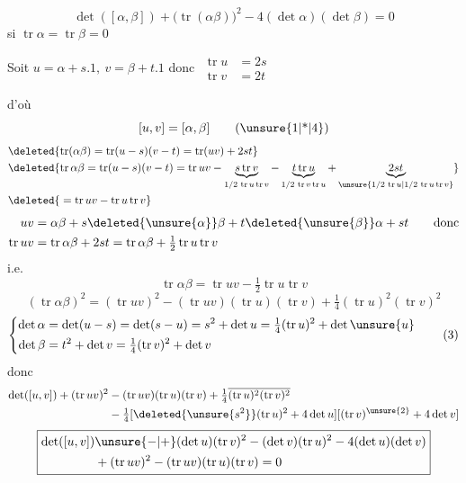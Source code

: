 \[
\det([\alpha,\beta])+\bigl(\operatorname{tr}(\alpha\beta)\bigr)^2-4(\det\alpha)(\det\beta)=0\tag*{(0)}
\]
si $\operatorname{tr}\alpha=\operatorname{tr}\beta=0$

Soit $u=\alpha+s.1,\ v=\beta+t.1$ donc $\begin{aligned}\operatorname{tr}u&=2s\\\operatorname{tr}v&=2t\end{aligned}$

d'où
\[
[u,v]=[\alpha,\beta]\tag*{(\unsure{1|*|4})}
\]
\[
\begin{aligned}
&\deleted{\operatorname{tr}(\alpha\beta)=\operatorname{tr}(u-s)(v-t)=\operatorname{tr}(uv)+2st}\\
&\deleted{\operatorname{tr}\alpha\beta=\operatorname{tr}(u-s)(v-t)=\operatorname{tr}uv-\underbrace{s\operatorname{tr}v}_{1/2\,\operatorname{tr}u\operatorname{tr}v}-\underbrace{t\operatorname{tr}u}_{1/2\,\operatorname{tr}v\operatorname{tr}u}+\underbrace{2st}_{\unsure{1/2\,\operatorname{tr}u|1/2\,\operatorname{tr}u\operatorname{tr}v}}}\\
&\deleted{{}=\operatorname{tr}uv-\operatorname{tr}u\operatorname{tr}v}
\end{aligned}
\]
\[
\begin{aligned}
uv&=\alpha\beta+s\deleted{\unsure{\alpha}}\beta+t\deleted{\unsure{\beta}}\alpha+st\qquad\text{donc}\\
\operatorname{tr}uv&=\operatorname{tr}\alpha\beta+2st=\operatorname{tr}\alpha\beta+\tfrac12\operatorname{tr}u\operatorname{tr}v
\end{aligned}
\]
i.e.
\[
\operatorname{tr}\alpha\beta=\operatorname{tr}uv-\tfrac12\operatorname{tr}u\operatorname{tr}v
\]
\[
(\operatorname{tr}\alpha\beta)^2=(\operatorname{tr}uv)^2-(\operatorname{tr}uv)(\operatorname{tr}u)(\operatorname{tr}v)+\tfrac14(\operatorname{tr}u)^{2}(\operatorname{tr}v)^2\tag*{(2)}
\]
\[
\left\{\begin{aligned}
\det\alpha&=\det(u-s)=\det(s-u)=s^2+\det u=\tfrac14(\operatorname{tr}u)^2+\det\unsure{u}\\
\det\beta&=t^2+\det v=\tfrac14(\operatorname{tr}v)^2+\det v
\end{aligned}\right.\tag*{(3)}
\]
donc
\[
\begin{aligned}
\det([u,v])+(\operatorname{tr}uv)^2&-(\operatorname{tr}uv)(\operatorname{tr}u)(\operatorname{tr}v)+\tfrac14\overline{(\operatorname{tr}u)^2(\operatorname{tr}v)^2}\\
&-\tfrac14[\deleted{\unsure{s^2}}(\operatorname{tr}u)^2+4\det u][(\operatorname{tr}v)^{\unsure{2}}+4\det v]
\end{aligned}
\]
\[
\boxed{\begin{aligned}
\det([u,v])&\unsure{-|+}(\det u)(\operatorname{tr}v)^2-(\det v)(\operatorname{tr}u)^2-4(\det u)(\det v)\\
&+(\operatorname{tr}uv)^2-(\operatorname{tr}uv)(\operatorname{tr}u)(\operatorname{tr}v)=0
\end{aligned}}
\]
